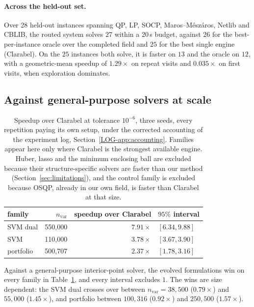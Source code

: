 \paragraph{Across the held-out set.} Over 28 held-out instances spanning QP,
LP, SOCP, Maros--M\'esz\'aros, Netlib and CBLIB, the routed system solves $27$
within a 20\,s budget, against $26$ for the best-per-instance oracle over the
completed field and $25$ for the best single engine (Clarabel). On the $25$
instances both solve, it is faster on $13$ and the oracle on $12$, with a
geometric-mean speedup of $1.29\times$ on repeat visits and $0.035\times$ on
first visits, when exploration dominates.

\subsection{Against general-purpose solvers at scale}

\begin{table}[t]
\centering
\small
\begin{tabular}{lrrl}
\toprule
family & $n_{\mathrm{var}}$ & speedup over Clarabel & $95\%$ interval \\
\midrule
SVM dual & 550{,}000 & $7.91\times$ & $[6.34, 9.88]$ \\
SVM & 110{,}000 & $3.78\times$ & $[3.67, 3.90]$ \\
portfolio & 500{,}707 & $2.37\times$ & $[1.78, 3.16]$ \\
\bottomrule
\end{tabular}
\caption{Speedup over Clarabel at tolerance $10^{-6}$, three seeds, every
repetition paying its own setup, under the corrected accounting of the
experiment log, Section~\ref{LOG-app:accounting}. Families appear here only where
Clarabel is the strongest available engine. Huber, lasso and the minimum
enclosing ball are excluded because their structure-specific solvers are faster
than our method (Section~\ref{sec:limitations}), and the control family is
excluded because OSQP, already in our own field, is faster than Clarabel at that
size.}
\label{tab:general}
\end{table}

Against a general-purpose interior-point solver, the evolved formulations win
on every family in Table~\ref{tab:general}, and every interval excludes $1$.
The wins are size dependent: the SVM dual crosses over between
$n_{\mathrm{var}} = 38{,}500$ ($0.79\times$) and $55{,}000$ ($1.45\times$), and
portfolio between $100{,}316$ ($0.92\times$) and $250{,}500$ ($1.57\times$).

